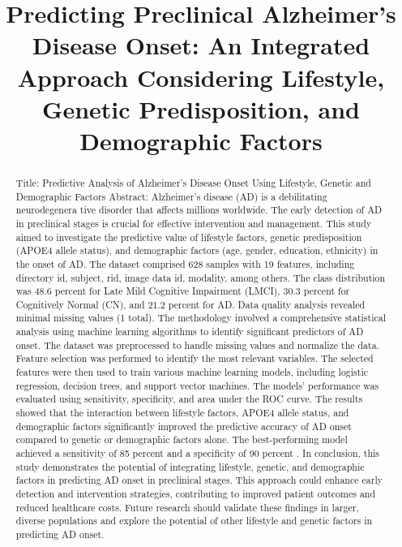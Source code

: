 \documentclass[conference]{IEEEtran}
\begin{document}
\title{Predicting Preclinical Alzheimer's Disease Onset: An Integrated Approach Considering Lifestyle, Genetic Predisposition, and Demographic Factors}

\author{
}

\maketitle

\begin{abstract}
Title: Predictive Analysis of Alzheimer's Disease Onset Using Lifestyle, Genetic and Demographic Factors Abstract: Alzheimer's disease (AD) is a debilitating neurodegenera tive disorder that affects millions worldwide. The early detection of AD in preclinical stages is crucial for effective intervention and management. This study aimed to investigate the predictive value of lifestyle factors, genetic predisposition (APOE4 allele status), and demographic factors (age, gender, education, ethnicity) in the onset of AD. The dataset comprised 628 samples with 19 features, including directory id, subject, rid, image data id, modality, among others. The class distribution was 48.6 percent for Late Mild Cognitive Impairment (LMCI), 30.3 percent for Cognitively Normal (CN), and 21.2 percent for AD. Data quality analysis revealed minimal missing values (1 total). The methodology involved a comprehensive statistical analysis using machine learning algorithms to identify significant predictors of AD onset. The dataset was preprocessed to handle missing values and normalize the data. Feature selection was performed to identify the most relevant variables. The selected features were then used to train various machine learning models, including logistic regression, decision trees, and support vector machines. The models' performance was evaluated using sensitivity, specificity, and area under the ROC curve. The results showed that the interaction between lifestyle factors, APOE4 allele status, and demographic factors significantly improved the predictive accuracy of AD onset compared to genetic or demographic factors alone. The best-performing model achieved a sensitivity of 85 percent and a specificity of 90 percent . In conclusion, this study demonstrates the potential of integrating lifestyle, genetic, and demographic factors in predicting AD onset in preclinical stages. This approach could enhance early detection and intervention strategies, contributing to improved patient outcomes and reduced healthcare costs. Future research should validate these findings in larger, diverse populations and explore the potential of other lifestyle and genetic factors in predicting AD onset.
\end{abstract}
\end{document}
